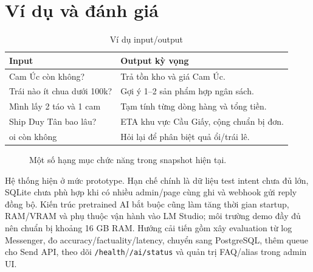 \documentclass[10pt,a4paper,twocolumn]{article}
\begin{document}
\section{Ví dụ và đánh giá}
\begin{table}[H]
\centering
\caption{Ví dụ input/output}
\label{tab:examples}
\scriptsize
\begin{tabularx}{\columnwidth}{@{}L{0.44\columnwidth}Y@{}}
\toprule
\textbf{Input} & \textbf{Output kỳ vọng} \\
\midrule
Cam Úc còn không? & Trả tồn kho và giá Cam Úc. \\
Trái nào ít chua dưới 100k? & Gợi ý 1--2 sản phẩm hợp ngân sách. \\
Mình lấy 2 táo và 1 cam & Tạm tính từng dòng hàng và tổng tiền. \\
Ship Duy Tân bao lâu? & ETA khu vực Cầu Giấy, cộng chuẩn bị đơn. \\
oi còn không & Hỏi lại để phân biệt quả ổi/trái lê. \\
\bottomrule
\end{tabularx}
\end{table}

\begin{figure}[H]
\centering
{}
\caption{Một số hạng mục chức năng trong snapshot hiện tại.}
\label{fig:features}
\end{figure}

Hệ thống hiện ở mức prototype. Hạn chế chính là dữ liệu test intent chưa đủ lớn, SQLite chưa phù hợp khi có nhiều admin/page cùng ghi và webhook gửi reply đồng bộ. Kiến trúc pretrained AI bắt buộc cũng làm tăng thời gian startup, RAM/VRAM và phụ thuộc vận hành vào LM Studio; môi trường demo đầy đủ nên chuẩn bị khoảng 16 GB RAM. Hướng cải tiến gồm xây evaluation từ log Messenger, đo accuracy/factuality/latency, chuyển sang PostgreSQL, thêm queue cho Send API, theo dõi \texttt{/health}/\texttt{/ai/status} và quản trị FAQ/alias trong admin UI.
\end{document}
